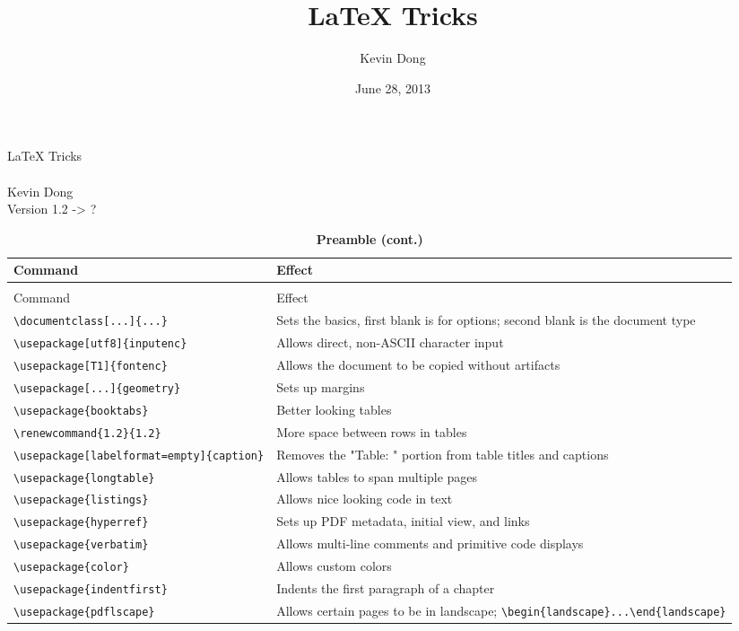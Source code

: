 \documentclass[10pt,letterpaper,landscape]{article}	%
\title{\LaTeX \mbox{} Tricks}
\author{Kevin Dong}
\date{June 28, 2013}
\renewcommand{\arraystretch}{1.2}					%
\newcommand{\tabletitle}[1]{{\textbf{\large{#1}}}}
\begin{document}
\begin{center}
{\huge \LaTeX \mbox{} Tricks} \\
\mbox{} \\
{\large Kevin Dong}
\mbox{} \\
{\normalsize Version 1.2 -> ?}
\end{center}

\begin{longtable}{ @{} l l @{} }
\caption{\tabletitle{Preamble}} \\ \toprule
Command & Effect \\ \midrule
\endfirsthead
\caption{\tabletitle{Preamble (cont.)}} \\ \toprule
Command & Effect \\ \midrule
\endhead
\lstinline!\documentclass[...]{...}! & Sets the basics, first blank is for options; second blank is the document type \\
\lstinline!\usepackage[utf8]{inputenc}! & Allows direct, non-ASCII character input \\
\lstinline!\usepackage[T1]{fontenc}! & Allows the document to be copied without artifacts \\
\lstinline!\usepackage[...]{geometry}! & Sets up margins \\
\lstinline!\usepackage{booktabs}! & Better looking tables \\
\lstinline!\renewcommand{\arraystretch}{1.2}! & More space between rows in tables \\
\lstinline!\usepackage[labelformat=empty]{caption}! & Removes the "Table: " portion from table titles and captions \\
\lstinline!\usepackage{longtable}! & Allows tables to span multiple pages \\
\lstinline!\usepackage{listings}! & Allows nice looking code in text \\
\lstinline!\usepackage{hyperref}! & Sets up PDF metadata, initial view, and links \\
\lstinline!\usepackage{verbatim}! & Allows multi-line comments and primitive code displays \\
\lstinline!\usepackage{color}! & Allows custom colors \\
\lstinline!\usepackage{indentfirst}! & Indents the first paragraph of a chapter \\
\lstinline!\usepackage{pdflscape}! & Allows certain pages to be in landscape; \lstinline!\begin{landscape}...\end{landscape}! \\

\end{longtable}
\end{document}
